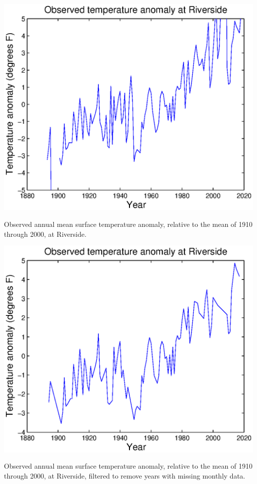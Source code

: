 \documentclass{tufte-book} %
\begin{document}
\begin{marginfigure}[0.0in]
\includegraphics[width=\linewidth]{ch1-plot-temperature6.eps}
\caption{Observed annual mean surface temperature anomaly, relative to the mean of 1910 through 2000, at Riverside.}
\label{fig:ch1-plot-temperature6}
\end{marginfigure}

\begin{marginfigure}[0.0in]
\includegraphics[width=\linewidth]{ch1-plot-temperature7.eps}
\caption{Observed annual mean surface temperature anomaly, relative to the mean of 1910 through 2000, at Riverside, filtered to remove years with missing monthly data.}
\label{fig:ch1-plot-temperature7}
\end{marginfigure}
\end{document}
